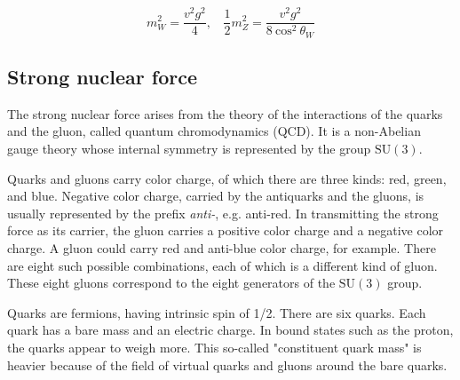 \begin{equation}
\label{eq:WZmass}
m_W^2 = \frac{v^2 g^2}{4},\:\:\:\:\frac{1}{2}m_Z^2 = \frac{v^2g^2}{8\:\mathrm{cos}^2\:\theta_W}
\end{equation}


\subsection{Strong nuclear force}

The strong nuclear force arises from the theory of the interactions of the quarks and the gluon, called quantum chromodynamics (QCD).
It is a non-Abelian gauge theory whose internal symmetry is represented by the group $\mathrm{SU}(3)$.

Quarks and gluons carry color charge, of which there are three kinds: red, green, and blue.
Negative color charge, carried by the antiquarks and the gluons, is usually represented by the prefix \textit{anti-}, e.g. anti-red.
In transmitting the strong force as its carrier, the gluon carries a positive color charge and a negative color charge.
A gluon could carry red and anti-blue color charge, for example.
There are eight such possible combinations, each of which is a different kind of gluon.
These eight gluons correspond to the eight generators of the $\mathrm{SU}(3)$ group.

Quarks are fermions, having intrinsic spin of 1/2. There are six quarks.
Each quark has a bare mass and an electric charge.
In bound states such as the proton, the quarks appear to weigh more.
This so-called "constituent quark mass" is heavier because of the field of virtual quarks and gluons around the bare quarks.

